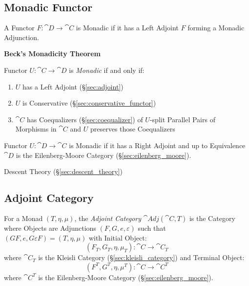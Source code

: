 \subsection{Monadic Functor}\label{sec:monadic_functor}

A Functor $F : \cat{D} \rightarrow \cat{C}$ is Monadic if it has
a Left Adjoint $F$ forming a Monadic Adjunction.

\textbf{Beck's Monadicity Theorem}

Functor $U : \cat{C} \rightarrow \cat{D}$ is \emph{Monadic} if
and only if:
\begin{enumerate}
  \item $U$ has a Left Adjoint (\S\ref{sec:adjoint})
  \item $U$ is Conservative (\S\ref{sec:conservative_functor})
  \item $\cat{C}$ has Coequalizers (\S\ref{sec:coequalizer}) of
    $U$-split Parallel Pairs of Morphisms in $\cat{C}$ and $U$
    preserves those Coequalizers
\end{enumerate}

Functor $U : \cat{D} \rightarrow \cat{C}$ is Monadic if it has a
Right Adjoint and up to Equivalence $\cat{D}$ is the
Eilenberg-Moore Category (\S\ref{sec:eilenberg_moore}).
\cite{lambek-scott88}

Descent Theory (\S\ref{sec:descent_theory})



\subsection{Adjoint Category}\label{sec:adjoint_category}

For a Monad $(T,\eta,\mu)$, the \emph{Adjoint Category}
$\cat{Adj}(\cat{C}, T)$ is the Category where Objects are
Adjunctions $(F,G,e,\varepsilon)$ such that $(GF,e,G \varepsilon F) =
(T,\eta,\mu)$ with Initial Object:
\[
  (F_T, G_T, \eta, \mu_T) : \cat{C} \rightarrow \cat{C}_T
\]
where $\cat{C}_T$ is the Kleisli Category
(\S\ref{sec:kleisli_category}) and Terminal Object:
\[
  (F^T, G^T, \eta, \mu^T) : \cat{C} \rightarrow \cat{C}^T
\]
where $\cat{C}^T$ is the Eilenberg-Moore Category
(\S\ref{sec:eilenberg_moore}).



